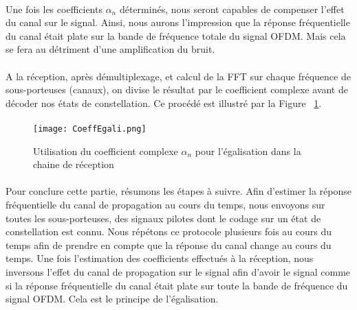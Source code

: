 \paragraph{}
Une fois les coefficients $\alpha_n$ déterminés, nous seront capables de compenser l'effet
du canal sur le signal. Ainsi, nous aurons l'impression que la réponse
fréquentielle du canal était plate sur la bande de fréquence totale du signal
OFDM. Mais cela se fera au détriment d'une amplification du bruit.
\paragraph{}
A la réception, après démultiplexage, et calcul de la FFT sur
chaque fréquence de sous-porteuses (canaux), on divise le résultat par le
coefficient complexe avant de décoder nos états de constellation. Ce procédé est
illustré par la Figure ~\ref{UtilCoeff}.

\paragraph{}
\vspace{1\baselineskip}
\begin{figure}[!h]
  \centering
  \texttt{[image: CoeffEgali.png]}
  \caption{Utilisation du coefficient complexe $\alpha_n$ pour l'égalisation dans la chaine de réception }
	\label{UtilCoeff}
\end{figure}
\vspace{2\baselineskip}

\paragraph{}
Pour conclure cette partie, résumons les étapes à suivre. Afin d'estimer la
réponse fréquentielle du canal de propagation au cours du temps, nous envoyons
sur toutes les sous-porteuses, des signaux pilotes dont le codage sur un état de
constellation est connu. Nous répétons ce protocole plusieurs fois au cours du
temps afin de prendre en compte que la réponse du canal change au cours du
temps. Une fois l'estimation des coefficients effectués à la réception, nous
inversons l'effet du canal de propagation sur le signal afin d'avoir le signal
comme si la réponse fréquentielle du canal était plate sur toute la bande de
fréquence du signal OFDM. Cela est le principe de l'égalisation.

